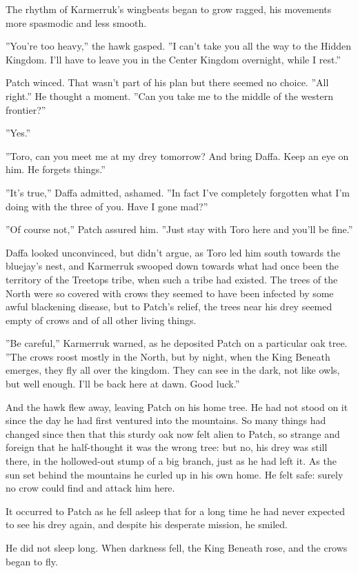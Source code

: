 \documentclass[12pt]{book}
\begin{document}
The rhythm of Karmerruk's wingbeats began to grow ragged, his movements more spasmodic and less smooth.\par
 ''You're too heavy,'' the hawk gasped. ''I can't take you all the way to the Hidden Kingdom. I'll have to leave you in the Center Kingdom overnight, while I rest.''\par
 Patch winced. That wasn't part of his plan %
 but there seemed no choice. ''All right.'' He thought a moment. ''Can you take me to the middle of the western frontier?''\par
 ''Yes.''\par
 ''Toro, can you meet me at my drey tomorrow? And bring Daffa. Keep an eye on him. He forgets things.''\par
 ''It's true,'' Daffa admitted, ashamed. ''In fact I've completely forgotten what I'm doing with the three of you. Have I gone mad?''\par
 ''Of course not,'' Patch assured him. ''Just stay with Toro here and you'll be fine.''\par
 Daffa looked unconvinced, but didn't argue, as Toro led him south towards the bluejay's nest, and Karmerruk swooped down towards what had once been the territory of the Treetops tribe, when such a tribe had existed. The trees of the North were so covered with crows they seemed to have been infected by some awful blackening disease, but to Patch's relief, the trees near his drey seemed empty of crows %
 and of all other living things.\par
 ''Be careful,'' Karmerruk warned, as he deposited Patch on a particular oak tree. ''The crows roost mostly in the North, but by night, when the King Beneath emerges, they fly all over the kingdom. They can see in the dark, not like owls, but well enough. I'll be back here at dawn. Good luck.''\par
 And the hawk flew away, leaving Patch on his home tree. He had not stood on it since the day he had first ventured into the mountains. So many things had changed since then that this sturdy oak now felt alien to Patch, so strange and foreign that he half-thought it was the wrong tree: but no, his drey was still there, in the hollowed-out stump of a big branch, just as he had left it. As the sun set behind the mountains he curled up in his own home. He felt safe: surely no crow could find and attack him here.\par
It occurred to Patch as he fell asleep that for a long time he had never expected to see his drey again, and despite his desperate mission, he smiled.\par
 He did not sleep long. When darkness fell, the King Beneath rose, and the crows began to fly.\par
\end{document}
